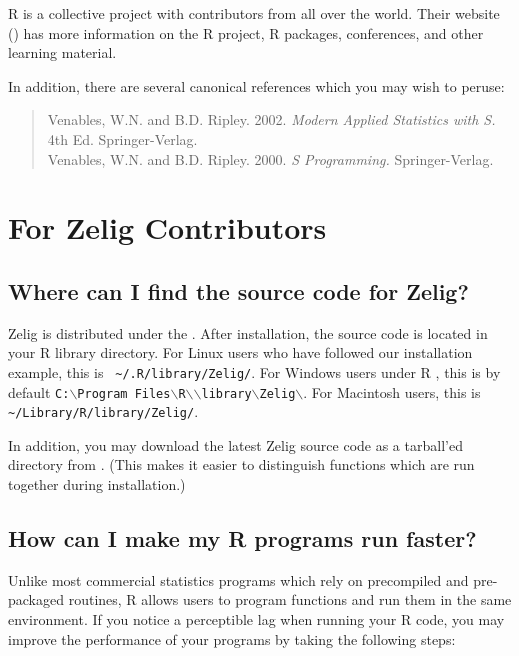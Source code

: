 R is a collective project with contributors from all over the world.
Their website
() has more
information on the R project, R packages, conferences, and other
learning material.

In addition, there are several canonical references which you may
wish to peruse:
\begin{verse}
Venables, W.N. and B.D. Ripley.  2002. \emph{Modern Applied Statistics with S.} 4th Ed.  Springer-Verlag.  \\
Venables, W.N. and B.D. Ripley.  2000. \emph{S Programming.} Springer-Verlag.  \\
\end{verse}

\section{For Zelig Contributors}

\subsection*{Where can I find the source code for Zelig?}

Zelig is distributed under the .  After installation,
the source code is located in your R library directory.  For Linux
users who have followed our installation example, this is {\tt
\~{}/.R/library/Zelig/}.  For Windows users under R \fullrvers, this is by
default {\tt C:$\backslash$Program Files$\backslash$R$\backslash$\rwvers$\backslash$library$\backslash$Zelig$\backslash$}.
For Macintosh users, this is {\tt \~{}/Library/R/library/Zelig/}.

In addition, you may download the latest Zelig
source code as a tarball'ed directory from
.  
(This makes it easier to distinguish functions which are run together during installation.)

\subsection*{How can I make my R programs run faster?}

Unlike most commercial statistics programs which rely on precompiled
and pre-packaged routines, R allows users to program functions and run
them in the same environment.  If you notice a perceptible lag when
running your R code, you may improve the performance of your programs
by taking the following steps:

